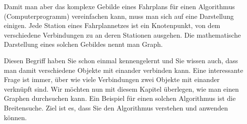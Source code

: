 Damit man aber das komplexe Gebilde eines Fahrplans für einen Algorithmus (Computerprogramm) vereinfachen kann, muss man sich auf eine Darstellung einigen. 
Jede Station eines Fahrplannetzes ist ein Knotenpunkt, von dem verschiedene Verbindungen zu  an deren Stationen ausgehen. 
Die mathematische Darstellung eines solchen Gebildes nennt man Graph.

Diesen Begriff haben Sie schon einmal kennengelernt und Sie wissen auch, dass man damit verschiedene Objekte mit einander verbinden kann. 
Eine interessante Frage ist immer, über wie viele Verbindungen zwei Objekte mit einander verknüpft sind. 
Wir möchten nun mit diesem Kapitel überlegen, wie man einen Graphen durchsuchen kann.
Ein Beispiel für einen solchen Algorithmus ist die Breitensuche. 
Ziel ist es, dass Sie den Algorithmus verstehen und anwenden können. 

%


